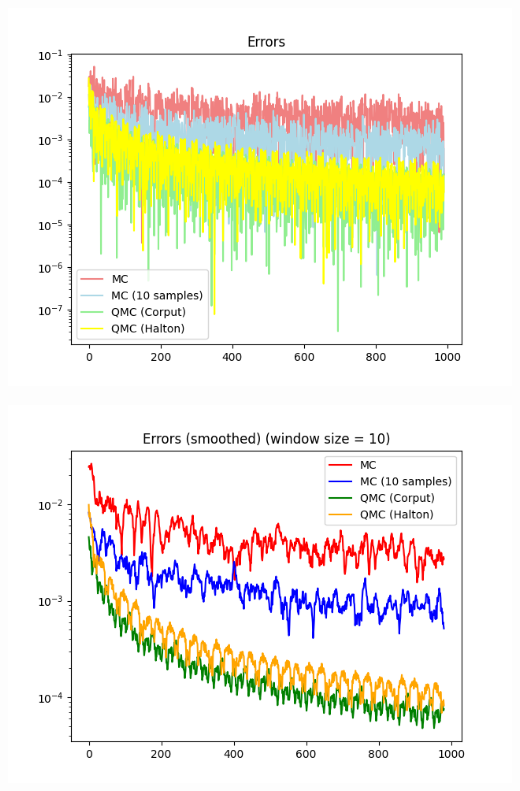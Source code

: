 \documentclass[a4paper,12pt]{article}
\newenvironment{Figure}
  {\par\medskip\noindent\minipage{\linewidth}}
  {\endminipage\par\medskip}
\begin{document}
\begin{multicols}{2}
    \begin{Figure}
        \includegraphics[scale=0.6]{img/errors.png}
        \centering
    \end{Figure}

    \columnbreak

    \begin{Figure}
        \includegraphics[scale=0.6]{img/errors_smoothed.png}
        \centering
    \end{Figure}
\end{multicols}
\end{document}

